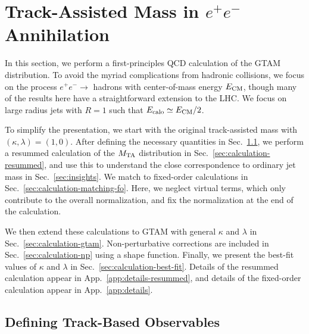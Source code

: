 \documentclass[letterpaper,11pt]{article}
\newcommand{\Sec}[1]{Sec.~\ref{#1}}
\newcommand{\App}[1]{App.~\ref{#1}}
\begin{document}


\section{Track-Assisted Mass in $e^+e^-$ Annihilation}
\label{sec:calculation}



In this section, we perform a first-principles QCD calculation of the GTAM distribution.
%
To avoid the myriad complications from hadronic collisions, we focus on the process $e^+e^-\rightarrow$ hadrons with center-of-mass energy $E_{\rm CM}$, though many of the results here have a straightforward extension to the LHC.
%
We focus on large radius jets with $R=1$ such that $E_{\rm calo} \simeq E_{\rm CM}/2$.

To simplify the presentation, we start with the original track-assisted mass with $(\kappa, \lambda)= (1, 0)$.
%
After defining the necessary quantities in \Sec{sec:calculation-definitions}, we perform a resummed calculation of the $M_{\rm TA}$ distribution in \Sec{sec:calculation-resummed}, and use this to understand the close correspondence to ordinary jet mass in \Sec{sec:insights}.
%
We match to fixed-order calculations in \Sec{sec:calculation-matching-fo}.
%
Here, we neglect virtual terms, which only contribute to the overall normalization, and fix the normalization at the end of the calculation. 

We then extend these calculations to GTAM with general $\kappa$ and $\lambda$ in \Sec{sec:calculation-gtam}.
%
Non-perturbative corrections are included in \Sec{sec:calculation-np} using a shape function.
%
Finally, we present the best-fit values of $\kappa$ and $\lambda$ in \Sec{sec:calculation-best-fit}.
%
Details of the resummed calculation appear in \App{app:details-resummed}, and details of the fixed-order calculation appear in \App{app:details}.



\subsection{Defining Track-Based Observables}
\label{sec:calculation-definitions}
\end{document}
